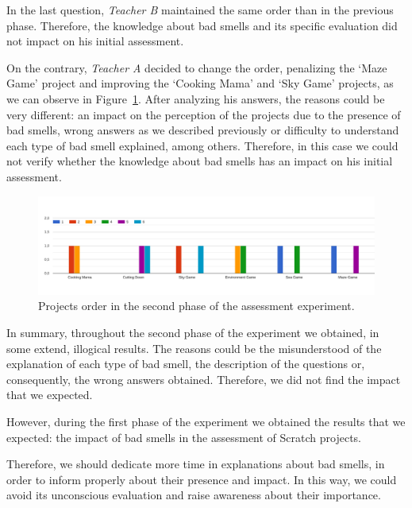 In the last question, \textit{Teacher B} maintained the same order than in the previous phase. Therefore, the knowledge about bad smells and its specific evaluation did not impact on his initial assessment.

On the contrary, \textit{Teacher A} decided to change the order, penalizing the `Maze Game' project and improving the `Cooking Mama' and `Sky Game' projects, as we can observe in Figure~\ref{fig:projects_order_2}. After analyzing his answers, the reasons could be very different: an impact on the perception of the projects due to the presence of bad smells, wrong answers as we described previously or difficulty to understand each type of bad smell explained, among others. Therefore, in this case we could not verify whether the knowledge about bad smells has an impact on his initial assessment.

\begin{figure}
    \centering
    \includegraphics[width=16cm,                         keepaspectratio]{img/order_projects_2.png}
    \caption{Projects order in the second phase of the assessment experiment.}
    \label{fig:projects_order_2}
\end{figure}

\hfill

In summary, throughout the second phase of the experiment we obtained, in some extend, illogical results. The reasons could be the misunderstood of the explanation of each type of bad smell, the description of the questions or, consequently, the wrong answers obtained. Therefore, we did not find the impact that we expected.

However, during the first phase of the experiment we obtained the results that we expected: the impact of bad smells in the assessment of Scratch projects. 

Therefore, we should dedicate more time in explanations about bad smells, in order to inform properly about their presence and impact. In this way, we could avoid its unconscious evaluation and raise awareness about their importance.
